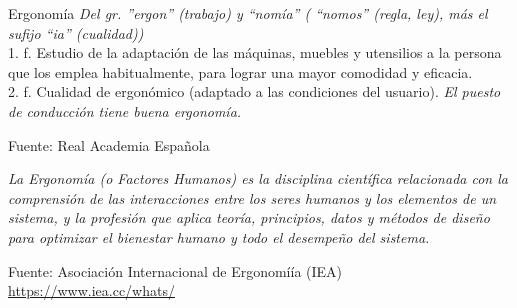 

\begin{frame}

      \begin{block}{Ergonom\'ia}
        \emph{Del gr. 
''ergon'' (trabajo) y 
``nom\'ia'' (  ``nomos'' (regla, ley), 
	m\'as el sufijo ``ia'' (cualidad))}\\
1. f. Estudio de la adaptaci\'on de las m\'aquinas, muebles y utensilios a la persona que los emplea habitualmente, para lograr una mayor comodidad y eficacia.\\
2. f. Cualidad de ergon\'omico (adaptado a las condiciones del usuario). \emph{El puesto de conducci\'on tiene buena ergonom\'ia.}

{\tiny Fuente: Real Academia Espa\~nola }

\vspace{3mm}

\emph{La Ergonom\'ia (o Factores Humanos) es la disciplina cient\'ifica relacionada con la comprensi\'on de las interacciones entre los seres humanos y los elementos de un sistema, y la profesi\'on que aplica teor\'ia, principios, datos y m\'etodos de dise\~no para optimizar el bienestar humano y todo el desempe\~no del sistema.
}

{\tiny Fuente: Asociaci\'on Internacional de Ergonom\'iía (IEA) \,
\url{https://www.iea.cc/whats/}}
      \end{block}

\end{frame}

